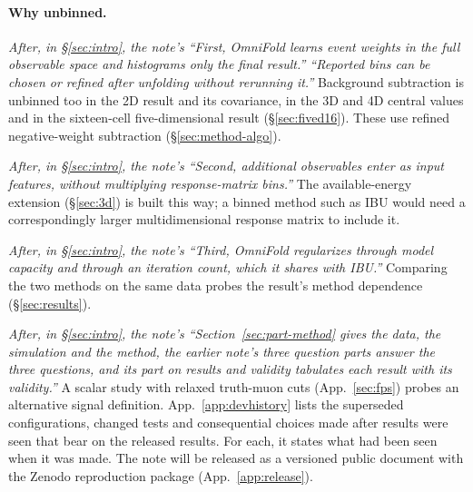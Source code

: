 \paragraph{Why unbinned.}
\emph{After, in \S\ref{sec:intro}, the note's ``First, OmniFold learns event weights in the full observable space and histograms only the final result.'' ``Reported bins can be chosen or refined after unfolding without rerunning it.''}
Background subtraction is unbinned too in the 2D result and its covariance, in the 3D and 4D central values and in the sixteen-cell five-dimensional result (\S\ref{sec:fived16}). These use refined negative-weight subtraction (\S\ref{sec:method-algo}).

\emph{After, in \S\ref{sec:intro}, the note's ``Second, additional observables enter as input features, without multiplying response-matrix bins.''}
The available-energy extension (\S\ref{sec:3d}) is built this way; a binned method such as IBU would need a correspondingly larger multidimensional response matrix to include it.

\emph{After, in \S\ref{sec:intro}, the note's ``Third, OmniFold regularizes through model capacity and through an iteration count, which it shares with IBU.''}
Comparing the two methods on the same data probes the result's method dependence (\S\ref{sec:results}).

\emph{After, in \S\ref{sec:intro}, the note's ``Section~\ref{sec:part-method} gives the data, the simulation and the method, the earlier note's three question parts answer the three questions, and its part on results and validity tabulates each result with its validity.''}
A scalar study with relaxed truth-muon cuts (App.~\ref{sec:fps}) probes an alternative signal definition. App.~\ref{app:devhistory} lists the superseded configurations, changed tests and consequential choices made after results were seen that bear on the released results. For each, it states what had been seen when it was made. The note will be released as a versioned public document with the Zenodo reproduction package (App.~\ref{app:release}).
